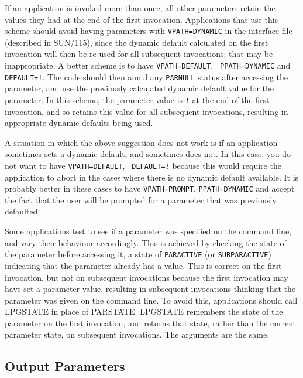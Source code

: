 \documentclass[twoside,11pt]{article}
\newcommand{\htmlref}[2]{#1}
\newcommand{\latex}[1]{#1}
\newcommand{\xref}[3]{#1}
\renewcommand{\_}{\texttt{\symbol{95}}}
\begin{document}
If an application is invoked more than once, all other parameters
retain the values they had at the end of the first invocation.
Applications that use this scheme should avoid having parameters with
{\tt VPATH=DYNAMIC} in the \xref{interface
file}{sun115}{the_vpath_field}\latex{ (described in SUN/115)}, since
the dynamic default calculated on the first invocation will then be
re-used for all subsequent invocations; that may be inappropriate.  A
better scheme is to have {\tt VPATH=DEFAULT}, \xref{{\tt
PPATH=DYNAMIC}}{sun115}{the_ppath_field} and \xref{{\tt
DEFAULT=!}}{sun115}{the_default_field}.  The code should then annul
any {\tt PAR\_\_NULL} status after accessing the parameter, and use
the previously calculated dynamic default value for the parameter.  In
this scheme, the parameter value is {\tt !} at the end of the first
invocation, and so retains this value for all subsequent invocations,
resulting in appropriate dynamic defaults being used.

A situation in which the above suggestion does not work is if an
application sometimes sets a dynamic default, and sometimes does not.
In this case, you do not want to have {\tt VPATH=DEFAULT}, {\tt
DEFAULT=!} because this would require the application to abort in the
cases where there is no dynamic default available.  It is probably
better in these cases to have {\tt VPATH=PROMPT}, {\tt PPATH=DYNAMIC}
and accept the fact that the user will be prompted for a parameter
that was previously defaulted.

Some applications test to see if a parameter was specified on the
command line, and vary their behaviour accordingly.  This is achieved
by checking the state of the parameter before accessing it, a state of
{\tt PAR\_\_ACTIVE} (or {\tt SUBPAR\_\_ACTIVE}) indicating that the
parameter already has a value.  This is correct on the first
invocation, but not on subsequent invocations because the first
invocation may have set a parameter value, resulting in subsequent
invocations thinking that the parameter was given on the command
line.  To avoid this, applications should call
\htmlref{LPG\_STATE}{LPG_STATE} in place of
\xref{PAR\_STATE}{sun114}{PAR_STATE}.  LPG\_STATE remembers the state of
the parameter on the first invocation, and returns that state, rather
than the current parameter state, on subsequent invocations.  The
arguments are the same.

\subsection{Output Parameters}
\end{document}
